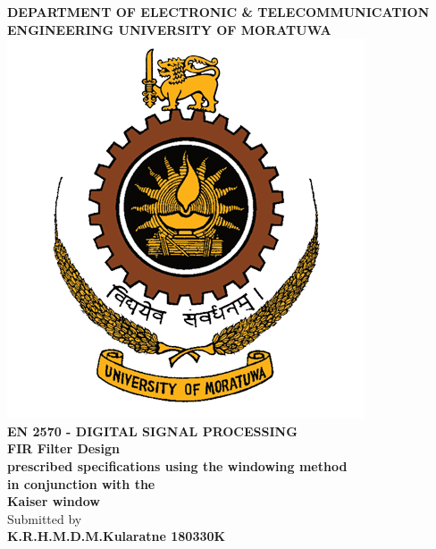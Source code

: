 \documentclass[a4paper]{article}
\begin{document}
\begin{titlepage}
\begin{center}
\vspace{0.8in}
\textbf{\large{DEPARTMENT OF ELECTRONIC & TELECOMMUNICATION ENGINEERING
UNIVERSITY OF MORATUWA}}\\
\vspace{0.5in}
\includegraphics[scale=0.5]{Unilogo.png}\\



\vspace{0.5in}
\textbf{EN 2570 - DIGITAL SIGNAL PROCESSING}\\
\vspace{0.5in}
\textbf{FIR Filter Design}\\
\vspace{0.5in}
\textbf{prescribed specifications using the windowing method \\in conjunction with the \\Kaiser window}\\
\vspace{1.5in}
Submitted by\\
\vspace{0.2in}
\textbf{K.R.H.M.D.M.Kularatne \hspace{8cm} 180330K}

\vspace{1cm}


\end{center}
\end{titlepage}
\end{document}
